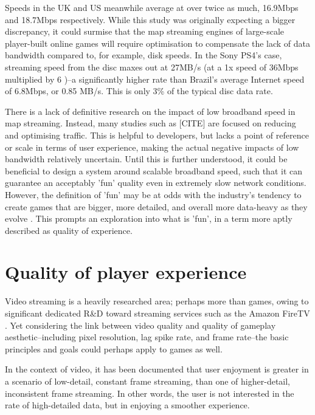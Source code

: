 \documentclass{scrartcl}
\begin{document}
Speeds in the UK and US meanwhile average at over twice as much, 16.9Mbps and 18.7Mbps respectively. While this study was originally expecting a bigger discrepancy, it could surmise that the map streaming engines of large-scale player-built online games will require optimisation to compensate the lack of data bandwidth compared to, for example, disk speeds. In the Sony PS4's case, streaming speed from the disc maxes out at 27MB/s (at a 1x speed of 36Mbps \cite{bluray} multiplied by 6 \cite{ps4specs})--a significantly higher rate than Brazil's average Internet speed of 6.8Mbps, or 0.85 MB/s. This is only 3\% of the typical disc data rate.

There is a lack of definitive research on the impact of low broadband speed in map streaming. Instead, many studies such as [CITE] are focused on reducing and optimising traffic. This is helpful to developers, but lacks a point of reference or scale in terms of user experience, making the actual negative impacts of low bandwidth relatively uncertain. Until this is further understood, it could be beneficial to design a system around scalable broadband speed, such that it can guarantee an acceptably 'fun' quality even in extremely slow network conditions. However, the definition of 'fun' may be at odds with the industry's tendency to create games that are bigger, more detailed, and overall more data-heavy as they evolve \cite{graphicsvsexperience}. This prompts an exploration into what is 'fun', in a term more aptly described as quality of experience.

\section{Quality of player experience} \label{player}
Video streaming is a heavily researched area; perhaps more than games, owing to significant dedicated R\&D toward streaming services such as the Amazon FireTV \cite{amazonresearch}. Yet considering the link between video quality and quality of gameplay aesthetic--including pixel resolution, lag spike rate, and frame rate--the basic principles and goals could perhaps apply to games as well.

In the context of video, it has been documented \cite{qoelargestudy} that user enjoyment is greater in a scenario of low-detail, constant frame streaming, than one of higher-detail, inconsistent frame streaming. In other words, the user is not interested in the rate of high-detailed data, but in enjoying a smoother experience.
\end{document}
